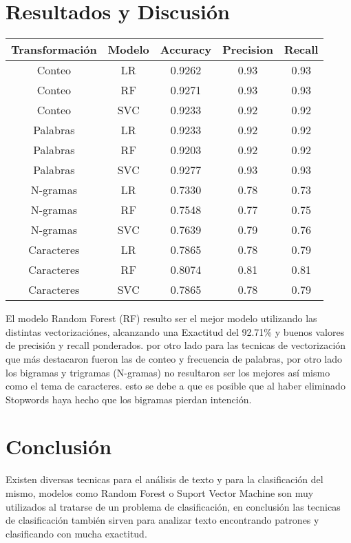 \documentclass[a4paper,12pt]{article}
\begin{document}
\section{Resultados y Discusión}


\begin{tabular}{|c|c|c|c|c|}
\hline
\textbf{Transformación} & \textbf{Modelo} & \textbf{Accuracy} & \textbf{Precision} & \textbf{Recall} \\
\hline
Conteo         & LR  & 0.9262 & 0.93 & 0.93 \\
Conteo         & RF  & 0.9271 & 0.93 & 0.93 \\
Conteo         & SVC & 0.9233 & 0.92 & 0.92 \\
Palabras       & LR  & 0.9233 & 0.92 & 0.92 \\
Palabras       & RF  & 0.9203 & 0.92 & 0.92 \\
Palabras       & SVC & 0.9277 & 0.93 & 0.93 \\
N-gramas       & LR  & 0.7330 & 0.78 & 0.73 \\
N-gramas       & RF  & 0.7548 & 0.77 & 0.75 \\
N-gramas       & SVC & 0.7639 & 0.79 & 0.76 \\
Caracteres     & LR  & 0.7865 & 0.78 & 0.79 \\
Caracteres     & RF  & 0.8074 & 0.81 & 0.81 \\
Caracteres     & SVC & 0.7865 & 0.78 & 0.79 \\
\hline
\end{tabular}


El modelo Random Forest (RF) resulto ser el mejor modelo utilizando las distintas vectorizaciónes, alcanzando una Exactitud del 92.71\% y buenos valores de precisión y recall ponderados. por otro lado para las tecnicas de vectorización que más destacaron fueron las de conteo y frecuencia de palabras, por otro lado los bigramas y trigramas (N-gramas) no resultaron ser los mejores así mismo como el tema de caracteres. esto se debe a que es posible que al haber eliminado Stopwords haya hecho que los bigramas pierdan intención.

\section{Conclusión}

Existen diversas tecnicas para el análisis de texto y para la clasificación del mismo, modelos como Random Forest o Suport Vector Machine son muy utilizados al tratarse de un problema de clasificación, en conclusión las tecnicas de clasificación también sirven para analizar texto encontrando patrones y clasificando con mucha exactitud.
\end{document}
